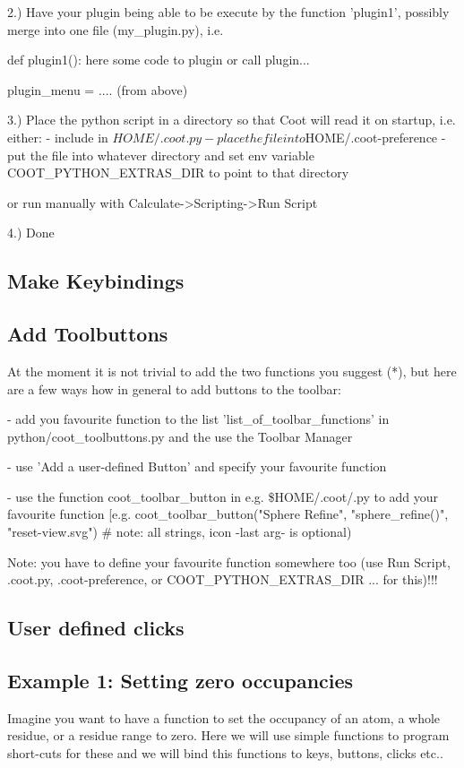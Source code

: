 \documentclass{article}
\begin{document}
2.) Have your plugin being able to be execute by the function 'plugin1', 
possibly merge into one file (my\_plugin.py), i.e.

\begin{python}
def plugin1():
    here some code to plugin or call plugin...

plugin_menu = .... (from above)
\end{python}

3.) Place the python script in a directory so that Coot will read it on 
startup, i.e. either:
- include in $HOME/.coot.py
- place the file into $HOME/.coot-preference
- put the file into whatever directory and set env variable 
COOT\_PYTHON\_EXTRAS\_DIR to point to that directory

or run manually with Calculate->Scripting->Run Script

4.) Done

\subsection{Make Keybindings}

\subsection{Add Toolbuttons}
\label{sec:button}
At the moment it is not trivial to add the two functions you suggest 
(*), but here are a few ways how in general to add buttons to the toolbar:

- add you favourite function to the list 'list\_of\_toolbar\_functions' in 
python/coot\_toolbuttons.py and the use the Toolbar Manager

- use 'Add a user-defined Button' and specify your favourite function

- use the function coot\_toolbar\_button in e.g. \$HOME/.coot/.py to add 
your favourite function [e.g. coot\_toolbar\_button("Sphere Refine", 
"sphere\_refine()", "reset-view.svg")  \# note: all strings, icon -last arg- is optional)

Note: you have to define your favourite function somewhere too (use Run 
Script, .coot.py, .coot-preference, or COOT\_PYTHON\_EXTRAS\_DIR ... for 
this)!!!


\subsection{User defined clicks}

\subsection{Example 1: Setting zero occupancies}
Imagine you want to have a function to set the occupancy of an atom, a whole 
residue, or a residue range to zero. Here we will use simple functions to 
program short-cuts for these and we will bind this functions to keys, buttons, clicks etc..
\end{document}
